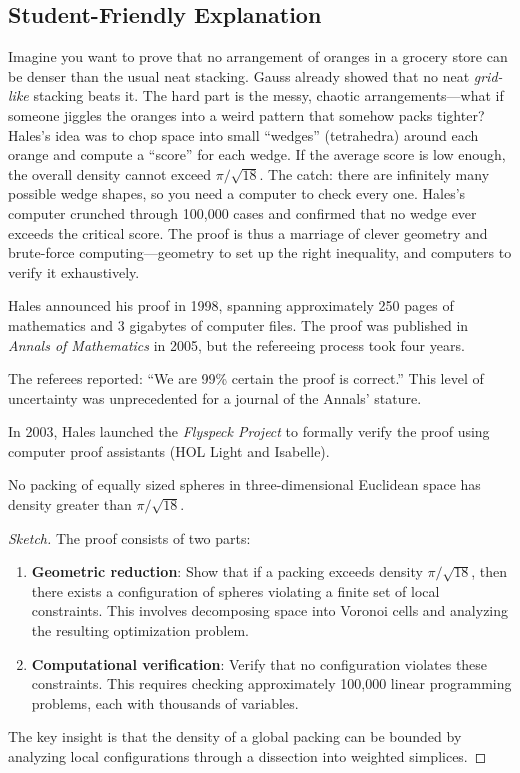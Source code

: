\subsection{Student-Friendly Explanation}
Imagine you want to prove that no arrangement of oranges in a grocery store can be denser than the usual neat stacking. Gauss already showed that no neat \emph{grid-like} stacking beats it. The hard part is the messy, chaotic arrangements---what if someone jiggles the oranges into a weird pattern that somehow packs tighter? Hales's idea was to chop space into small ``wedges'' (tetrahedra) around each orange and compute a ``score'' for each wedge. If the average score is low enough, the overall density cannot exceed $\pi/\sqrt{18}$. The catch: there are infinitely many possible wedge shapes, so you need a computer to check every one. Hales's computer crunched through 100,000 cases and confirmed that no wedge ever exceeds the critical score. The proof is thus a marriage of clever geometry and brute-force computing---geometry to set up the right inequality, and computers to verify it exhaustively.

\bigskip

Hales announced his proof in 1998, spanning approximately 250 pages of mathematics and 3 gigabytes of computer files. The proof was published in \emph{Annals of Mathematics} in 2005, but the refereeing process took four years.

The referees reported: ``We are 99\% certain the proof is correct.'' This level of uncertainty was unprecedented for a journal of the Annals' stature.

In 2003, Hales launched the \emph{Flyspeck Project} to formally verify the proof using computer proof assistants (HOL Light and Isabelle). 

\begin{theorem}
No packing of equally sized spheres in three-dimensional Euclidean space has density greater than $\pi/\sqrt{18}$.
\end{theorem}

\begin{proof}[Sketch]
The proof consists of two parts:
\begin{enumerate}
\item \textbf{Geometric reduction}: Show that if a packing exceeds density $\pi/\sqrt{18}$, then there exists a configuration of spheres violating a finite set of local constraints. This involves decomposing space into Voronoi cells and analyzing the resulting optimization problem.
\item \textbf{Computational verification}: Verify that no configuration violates these constraints. This requires checking approximately 100,000 linear programming problems, each with thousands of variables.
\end{enumerate}
The key insight is that the density of a global packing can be bounded by analyzing local configurations through a dissection into weighted simplices.
\end{proof}

